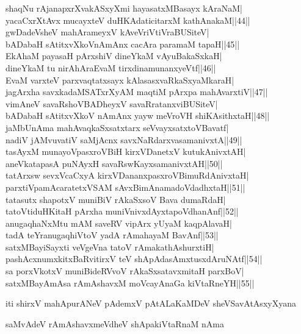 \documentclass{article}
\begin{document}
shaqNu rAjanapxrXvakASxyXmi hayasatxMBasayx kAraNaM|\\
yacaCxrXtAvx mucayxteV duHKAdaticitarxM kathAnakaM||44||\\
gwDadeVsheV mahArameyxV kAveVriVtiVraBUSiteV|\\
bADabaH sAtitxvXkoVnAmAnx cacAra paramaM tapaH||45||\\
EkAhaM payasaH pArxshiV dineYkaM vAyuBakaSxkaH|\\
dineYkaM tu nirAhAraEvaM tirxdinamunanxyeVtf||46||\\
EvaM varxteV parxvaqtatxsayx kAlasasxvaRkaSxyaMkaraH|\\
jagArxha savxkadaMSATxrXyAM maqtiM pArxpa mahAvarxtiV||47||\\
vimAneV savaRshoVBADheyxV savaRratanxviBUSiteV|\\
bADabaH sAtitxvXkoV nAmAnx yayw meVroVH shiKAsithxtaH||48||\\
jaMbUnAma mahAvaqkaSxsatxtarx seVvayxsatxtoVBavatf|\\
nadiV jAMvuvatiV saMjAcnx savxNaRdarxvasamanivxtA||49||\\
tasAyxM munayoVpasxroVBiH kirxVDanetxV kutukAnivxtAH|\\
aneVkatapasA puNAyxH savaRswKayxsamanivxtAH||50||\\
tatArxsw sevxVcaCxyA kirxVDananxpasxroVBimuRdAnivxtaH|\\
parxtiVpamAcaratetxVSAM sAvxBimAnamadoVdadhxtaH||51||\\
tatasutx shapotxV muniBiV rAkaSxsoV Bava dumaRdaH|\\
tatoVtiduHKitaH pArxha muniVnivxdAyxtapoVdhanAnf||52||\\
anugaqhaNxMtu mAM saveRV vipArx yUyaM kaqpAlavaH|\\
tadA teYranugaqhiVtoV yadA rAmahayaM BavAnf||53||\\
satxMBayiSayxti veVgeVna tatoV rAmakathAshurxtiH|\\
pashAcxnumxkitxBaRvitirxV teV shApAdasAmxtusxdAruNAtf||54||\\
sa porxVkotxV muniBideRVvoV rAkaSxsatavxmitaH parxBoV|\\
satxMBayAmAsa rAmAshavxM moVcayAnaGa kiVtaRneYH||55||

\begin{center}
iti shirxV mahApurANeV pAdemxV pAtALaKaMDeV sheVSavAtAsxyXyana
\end{center}

\begin{center}
saMvAdeV rAmAshavxmeVdheV shApakiVtaRnaM nAma
\end{center}
\end{document}
